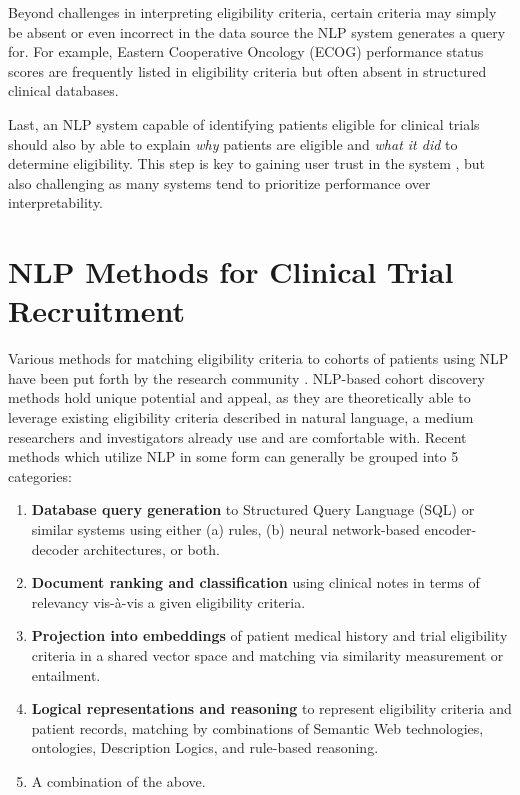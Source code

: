 \documentclass[../main.tex]{subfiles}
\begin{document}
Beyond challenges in interpreting eligibility criteria, certain criteria may simply be absent or even incorrect in the data source the NLP system generates a query for. For example, Eastern Cooperative Oncology (ECOG) performance status scores \cite{sok2019objective} are frequently listed in eligibility criteria but often absent in structured clinical databases.

Last, an NLP system capable of identifying patients eligible for clinical trials should also by able to explain \textit{why} patients are eligible and \textit{what it did} to determine eligibility. This step is key to gaining user trust in the system \cite{lundberg2018explainable, jermutus2022influences}, but also challenging as many systems tend to prioritize performance over interpretability.

\section{NLP Methods for Clinical Trial Recruitment}

Various methods for matching eligibility criteria to cohorts of patients using NLP have been put forth by the research community \cite{yuan2019criteria2query, soni2020patient, fang2022combining, zhang2020deepenroll, chen2019clinical, patrao2015recruit, dhayne2021emr2vec, liu2021evaluating, xiong2019cohort}. NLP-based cohort discovery methods hold unique potential and appeal, as they are theoretically able to leverage existing eligibility criteria described in natural language, a medium researchers and investigators already use and are comfortable with. Recent methods which utilize NLP in some form can generally be grouped into 5 categories:

\begin{enumerate}
    \item{\textbf{Database query generation} to Structured Query Language (SQL) or similar systems using either (a) rules, (b) neural network-based encoder-decoder architectures}, or both.
    \item{\textbf{Document ranking and classification} using clinical notes in terms of relevancy vis-à-vis a given eligibility criteria.}
    \item{\textbf{Projection into embeddings} of patient medical history and trial eligibility criteria in a shared vector space and matching via similarity measurement or entailment.}
    \item{\textbf{Logical representations and reasoning} to represent eligibility criteria and patient records, matching by combinations of Semantic Web technologies, ontologies, Description Logics, and rule-based reasoning.}
    \item{A combination of the above.}
\end{enumerate}
\end{document}

